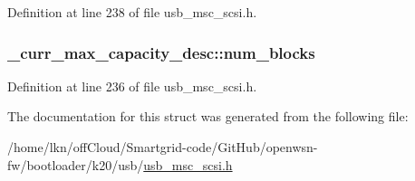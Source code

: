 Definition at line 238 of file usb\+\_\+msc\+\_\+scsi.\+h.

\subsubsection[{\texorpdfstring{num\+\_\+blocks}{num_blocks}}]{ \+\_\+curr\+\_\+max\+\_\+capacity\+\_\+desc\+::num\+\_\+blocks}\hypertarget{struct__curr__max__capacity__desc_a6cfb93ee5e37da46ffd68b17990fe298}{}\label{struct__curr__max__capacity__desc_a6cfb93ee5e37da46ffd68b17990fe298}


Definition at line 236 of file usb\+\_\+msc\+\_\+scsi.\+h.



The documentation for this struct was generated from the following file\+:\begin{DoxyCompactItemize}
\item 
/home/lkn/off\+Cloud/\+Smartgrid-\/code/\+Git\+Hub/openwsn-\/fw/bootloader/k20/usb/\hyperlink{usb__msc__scsi_8h}{usb\+\_\+msc\+\_\+scsi.\+h}\end{DoxyCompactItemize}
